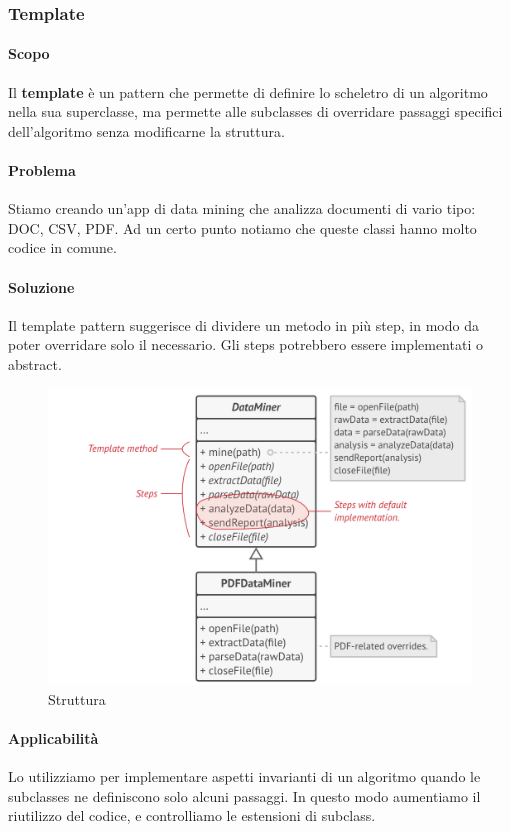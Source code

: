 \documentclass[11pt]{article}
\begin{document}
\subsubsection{Template}
\paragraph{Scopo}
Il \textbf{template} è un pattern che permette di definire lo scheletro di un algoritmo nella sua superclasse, ma permette alle subclasses di overridare passaggi specifici dell'algoritmo senza modificarne la struttura.  
\paragraph{Problema}
Stiamo creando un'app di data mining che analizza documenti di vario tipo: DOC, CSV, PDF. Ad un certo punto notiamo che queste classi hanno molto codice in comune. 
\paragraph{Soluzione}
Il template pattern suggerisce di dividere un metodo in più step, in modo da poter overridare solo il necessario. Gli steps potrebbero essere implementati o abstract. 
\begin{figure}[H]
    \includegraphics[width=\linewidth]{res/teoria/Template.png}
    \caption{Struttura}
\end{figure}
\paragraph{Applicabilità}
Lo utilizziamo per implementare aspetti invarianti di un algoritmo quando le subclasses ne definiscono solo alcuni passaggi. In questo modo aumentiamo il riutilizzo del codice, e controlliamo le estensioni di subclass.
\end{document}
